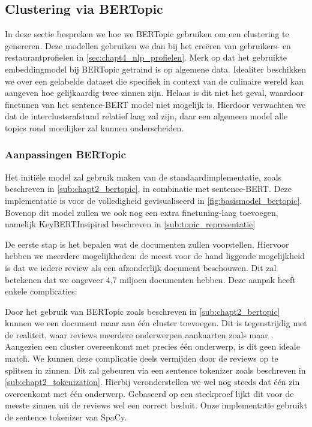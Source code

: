 \subsection{Clustering via BERTopic}
In deze sectie bespreken we hoe we BERTopic gebruiken om een clustering te genereren. Deze modellen gebruiken we dan bij het creëren van gebruikers- en restaurantprofielen in \autoref{sec:chapt4_nlp_profielen}. Merk op dat het gebruikte embeddingmodel bij BERTopic getraind is op algemene data. Idealiter beschikken we over een gelabelde dataset die specifiek in context van de culinaire wereld kan aangeven hoe gelijkaardig twee zinnen zijn. Helaas is dit niet het geval, waardoor finetunen van het sentence-BERT model niet mogelijk is. Hierdoor verwachten we dat de interclusterafstand relatief laag zal zijn, daar een algemeen model alle topics rond  moeilijker zal kunnen onderscheiden.

\subsubsection{Aanpassingen BERTopic}
Het initiële model zal gebruik maken van de standaardimplementatie, zoals beschreven in \autoref{sub:chapt2_bertopic}, in combinatie met sentence-BERT. Deze implementatie is voor de volledigheid gevisualiseerd in \autoref{fig:basismodel_bertopic}. Bovenop dit model zullen we ook nog een extra finetuning-laag toevoegen, namelijk KeyBERTInsipired beschreven in \autoref{sub:topic_representatie}


De eerste stap is het bepalen wat de documenten zullen voorstellen. Hiervoor hebben we meerdere mogelijkheden: de meest voor de hand liggende mogelijkheid is dat we iedere review als een afzonderlijk document beschouwen. Dit zal betekenen dat we ongeveer 4,7 miljoen documenten hebben. Deze aanpak heeft enkele complicaties:

Door het gebruik van BERTopic zoals beschreven in \autoref{sub:chapt2_bertopic} kunnen we een document maar aan één cluster toevoegen. Dit is tegenstrijdig met de realiteit, waar reviews meerdere onderwerpen aankaarten zoals  maar . Aangezien een cluster overeenkomt met precies één onderwerp, is dit geen ideale match. We kunnen deze complicatie deels vermijden door de reviews op te splitsen in zinnen. Dit zal gebeuren via een sentence tokenizer zoals beschreven in \autoref{sub:chapt2_tokenization}. Hierbij veronderstellen we wel nog steeds dat één zin overeenkomt met één onderwerp. Gebaseerd op een steekproef lijkt dit voor de meeste zinnen uit de reviews wel een correct besluit. Onze implementatie gebruikt de sentence tokenizer van SpaCy. \cite{spacy_main}

